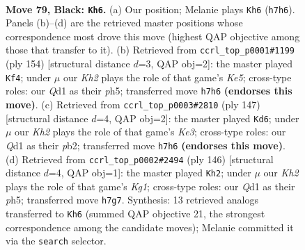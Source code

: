 \documentclass[11pt]{article}
\begin{document}
\clearpage

\begin{figure}[p]\centering
\begin{subfigure}{0.46\textwidth}\centering
\resizebox{\linewidth}{!}{%
\newchessgame
\chessboard[
  setfen={8/7k/1p6/p7/2P5/8/K7/3q4 b - - 15 79},
  showmover=false,
  pgfstyle=straightmove, color=movearrow, markmove={h7-h6}
]}
\caption{}
\end{subfigure}\hfill
\begin{subfigure}{0.46\textwidth}\centering
\resizebox{\linewidth}{!}{%
\newchessgame
\chessboard[
  setfen={5k2/8/8/p3K2p/2P5/1P6/8/8 w - - 3 78},
  showmover=false,
  pgfstyle=straightmove, color=movearrow, markmove={e5-f4}
]}
\caption{}
\end{subfigure}
\\[4pt]
\begin{subfigure}{0.46\textwidth}\centering
\resizebox{\linewidth}{!}{%
\newchessgame
\chessboard[
  setfen={8/6p1/4k1Pp/8/4K3/8/1P6/8 b - - 0 74},
  showmover=false,
  pgfstyle=straightmove, color=movearrow, markmove={e6-d6}
]}
\caption{}
\end{subfigure}\hfill
\begin{subfigure}{0.46\textwidth}\centering
\resizebox{\linewidth}{!}{%
\newchessgame
\chessboard[
  setfen={8/8/8/3k2Pp/5p1P/8/8/6K1 w - - 12 74},
  showmover=false,
  pgfstyle=straightmove, color=movearrow, markmove={g1-h2}
]}
\caption{}
\end{subfigure}
\caption{\textbf{Move 79, Black: \texttt{Kh6}.} (a) Our position; Melanie plays \texttt{Kh6} (\texttt{h7h6}). Panels (b)--(d) are the retrieved master positions whose correspondence most drove this move (highest QAP objective among those that transfer to it). (b) Retrieved from \texttt{ccrl\_top\_p0001\#1199} (ply 154) [structural distance $d$=3, QAP obj=2]: the master played \texttt{Kf4}; under $\mu$ our \emph{Kh2} plays the role of that game's \emph{Ke5}; cross-type roles: our \emph{Q}d1 as their \emph{p}h5; transferred move \texttt{h7h6} \textbf{(endorses this move)}. (c) Retrieved from \texttt{ccrl\_top\_p0003\#2810} (ply 147) [structural distance $d$=4, QAP obj=2]: the master played \texttt{Kd6}; under $\mu$ our \emph{Kh2} plays the role of that game's \emph{Ke3}; cross-type roles: our \emph{Q}d1 as their \emph{p}b2; transferred move \texttt{h7h6} \textbf{(endorses this move)}. (d) Retrieved from \texttt{ccrl\_top\_p0002\#2494} (ply 146) [structural distance $d$=4, QAP obj=1]: the master played \texttt{Kh2}; under $\mu$ our \emph{Kh2} plays the role of that game's \emph{Kg1}; cross-type roles: our \emph{Q}d1 as their \emph{p}h5; transferred move \texttt{h7g7}. Synthesis: 13 retrieved analogs transferred to \texttt{Kh6} (summed QAP objective 21, the strongest correspondence among the candidate moves); Melanie committed it via the \texttt{search} selector.}
\label{fig:thought-m157}
\end{figure}
\end{document}
